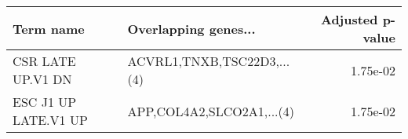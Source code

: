\begin{tabular}{llr}
\toprule
           Term name &       Overlapping genes... &  Adjusted p-value \\
\midrule
   CSR LATE UP.V1 DN & ACVRL1,TNXB,TSC22D3,...(4) &          1.75e-02 \\
ESC J1 UP LATE.V1 UP &  APP,COL4A2,SLCO2A1,...(4) &          1.75e-02 \\
\bottomrule
\end{tabular}
